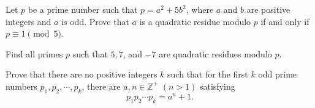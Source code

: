 \documentclass{subfile}
\begin{document}
	\begin{problem}
		Let $p$ be a prime number such that $p=a^2+5b^2$, where $a$ and $b$ are positive integers and $a$ is odd. Prove that $a$ is a quadratic residue modulo $p$ if and only if $p \equiv 1 \pmod 5$.
	\end{problem}


	\begin{problem} %
		Find all primes $p$ such that $5,7$, and $-7$ are quadratic residues modulo $p$.
	\end{problem}



	\begin{problem}
		Prove that there are no positive integers $k$ such that for the first $k$ odd prime numbers $p_1,p_2,\cdots,p_k$, there are $a,n\in\mathbb{Z}^+$ $(n>1)$ satisfying \[ p_1p_2\cdots p_k=a^n+1.\] %
	\end{problem}
\end{document}
